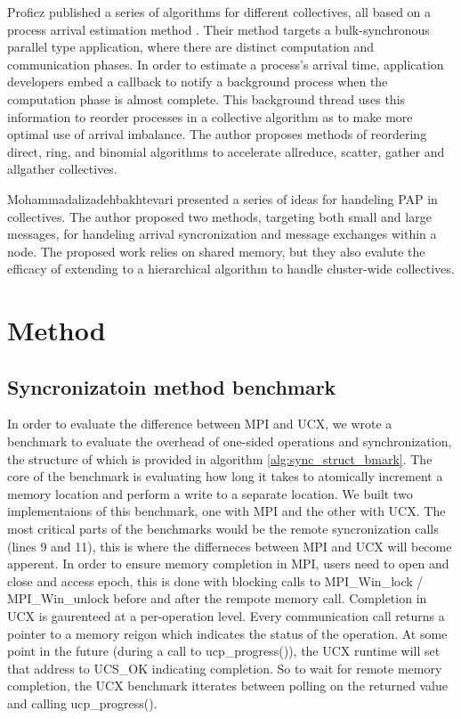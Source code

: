 Proficz published a series of algorithms for different collectives, all based on a process arrival estimation method \cite{Proficz2018ImprvAllReduceForImbPAP, Proficz2020PAPAwareScatterGather, Proficz2021AllGatherResilientToImbPAP}.
Their method targets a bulk-synchronous parallel type application, where there are distinct computation and communication phases.
In order to estimate a process's arrival time, application developers embed a callback to notify a background process when the computation phase is almost complete.
This background thread uses this information to reorder processes in a collective algorithm as to make more optimal use of arrival imbalance.
The author proposes methods of reordering direct, ring, and binomial algorithms to accelerate allreduce, scatter, gather and allgather collectives.

Mohammadalizadehbakhtevari \cite{Mohammadalizadehbakhtevari2021Thesis} presented a series of ideas for handeling PAP in collectives. 
The author proposed two methods, targeting both small and large messages, for handeling arrival syncronization and message exchanges within a node.
The proposed work relies on shared memory, but they also evalute the efficacy of extending to a hierarchical algorithm to handle cluster-wide collectives.

\section{Method}
\subsection{Syncronizatoin method benchmark}
In order to evaluate the difference between MPI and UCX, we wrote a benchmark to evaluate the overhead of one-sided operations and synchronization, the structure of which is provided in algorithm \ref{alg:sync_struct_bmark}.
The core of the benchmark is evaluating how long it takes to atomically increment a memory location and perform a write to a separate location.
We built two implementaions of this benchmark, one with MPI and the other with UCX. 
The most critical parts of the benchmarks would be the remote syncronization calls (lines 9 and 11), this is where the differneces between MPI and UCX will become apperent.  
In order to ensure memory completion in MPI, users need to open and close and access epoch, this is done with blocking calls to MPI\_Win\_lock / MPI\_Win\_unlock before and after the rempote memory call.
Completion in UCX is gaurenteed at a per-operation level. 
Every communication call returns a pointer to a memory reigon which indicates the status of the operation. 
At some point in the future (during a call to ucp\_progress()), the UCX runtime will set that address to UCS\_OK indicating completion.
So to wait for remote memory completion, the UCX benchmark itterates between polling on the returned value and calling ucp\_progress().

